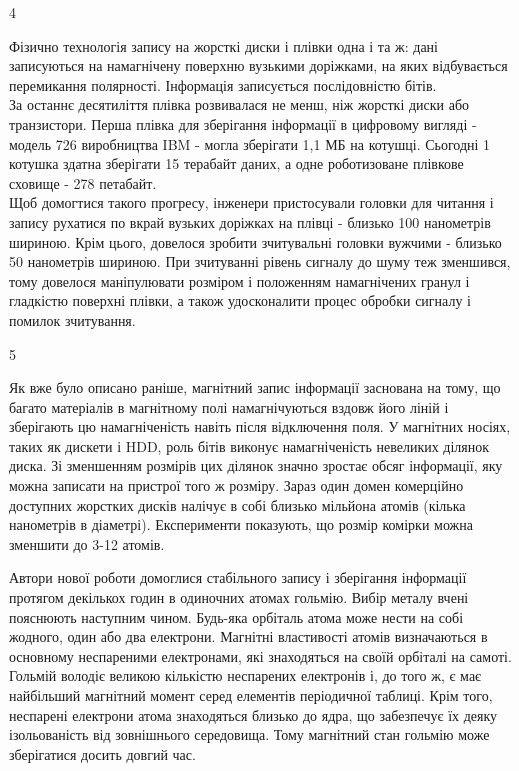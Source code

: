 \documentclass[a4paper,14pt]{extreport}
\begin{document}
  \noindent{\color{blue} \rule{\linewidth}{0.7mm}}
  \begin{center}4\end{center}
  \noindent{\color{blue} \rule{\linewidth}{0.7mm}}
  Фізично технологія запису на жорсткі диски і плівки одна і та ж: дані записуються на намагнічену поверхню вузькими доріжками, на яких відбувається перемикання полярності. Інформація записується послідовністю бітів.\\
  За останнє десятиліття плівка розвивалася не менш, ніж жорсткі диски або транзистори. Перша плівка для зберігання інформації в цифровому вигляді - модель 726 виробництва IBM - могла зберігати 1,1 МБ на котушці. Сьогодні 1 котушка здатна зберігати 15 терабайт даних, а одне роботизоване плівкове сховище - 278 петабайт.\\ 

  Щоб домогтися такого прогресу, інженери пристосували головки для читання і запису рухатися по вкрай вузьких доріжках на плівці - близько 100 нанометрів шириною. Крім цього, довелося зробити зчитувальні головки вужчими - близько 50 нанометрів шириною. При зчитуванні рівень сигналу до шуму теж зменшився, тому довелося маніпулювати розміром і положенням намагнічених гранул і гладкістю поверхні плівки, а також удосконалити процес обробки сигналу і помилок зчитування.\par

  \noindent{\color{blue} \rule{\linewidth}{0.7mm}}
  \begin{center}5\end{center}
  \noindent{\color{blue} \rule{\linewidth}{0.7mm}}
  Як вже було описано раніше, магнітний запис інформації заснована на тому, що багато матеріалів в магнітному полі намагнічуються вздовж його ліній і зберігають цю намагніченість навіть після відключення поля. У магнітних носіях, таких як дискети і HDD, роль бітів виконує намагніченість невеликих ділянок диска. Зі зменшенням розмірів цих ділянок значно зростає обсяг інформації, яку можна записати на пристрої того ж розміру. Зараз один домен комерційно доступних жорстких дисків налічує в собі близько мільйона атомів (кілька нанометрів в діаметрі). Експерименти показують, що розмір комірки можна зменшити до 3-12 атомів.\par

  Автори нової роботи домоглися стабільного запису і зберігання інформації протягом декількох годин в одиночних атомах гольмію. Вибір металу вчені пояснюють наступним чином. Будь-яка орбіталь атома може нести на собі жодного, один або два електрони. Магнітні властивості атомів визначаються в основному неспареними електронами, які знаходяться на своїй орбіталі на самоті. Гольмій володіє великою кількістю неспарених електронів і, до того ж, є має найбільший магнітний момент серед елементів періодичної таблиці. Крім того, неспарені електрони атома знаходяться близько до ядра, що забезпечує їх деяку ізольованість від зовнішнього середовища. Тому магнітний стан гольмію може зберігатися досить довгий час.\par
\end{document}
